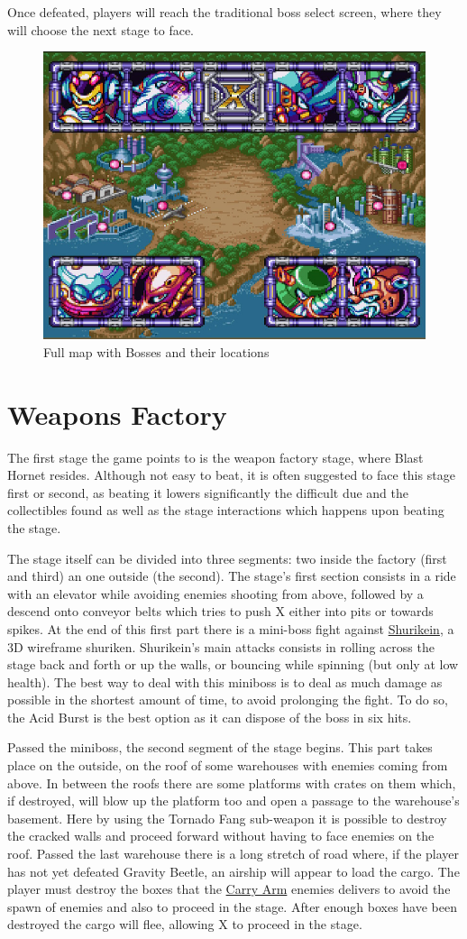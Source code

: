 Once defeated, players will reach the traditional boss select screen, where they will choose the next stage to face.
\begin{figure}[htp]
	\centering
	\includegraphics[width=0.5\linewidth]{figures/X3/Map.png}
	\caption{Full map with Bosses and their locations}
\end{figure}

\section{Weapons Factory}
The first stage the game points to is the weapon factory stage, where Blast Hornet resides. Although not easy to beat, it is often suggested to face this stage first or second, as beating it lowers significantly the difficult due and the collectibles found as well as the  stage interactions which happens upon beating the stage.

The stage itself can be divided into three segments: two inside the factory (first and third) an one outside (the second). The stage's first section consists in a ride with an elevator while avoiding enemies shooting from above, followed by a descend onto conveyor belts which tries to push X either into pits or towards spikes. At the end of this first part there is a mini-boss fight against \hyperlink{miniboss:Shurikein}{Shurikein}, a 3D wireframe shuriken. Shurikein's main attacks consists in rolling across the stage back and forth or up the walls, or bouncing while spinning (but only at low health). The best way to deal with this miniboss is to deal as much damage as possible in the shortest amount of time, to avoid prolonging the fight. To do so, the Acid Burst is the best option as it can dispose of the boss in six hits. 

Passed the miniboss, the second segment of the stage begins. This part takes place on the outside, on the roof of some warehouses with enemies coming from above. In between the roofs there are some platforms with crates on them which, if destroyed, will blow up the platform too and open a passage to the warehouse's basement. Here by using  the Tornado Fang sub-weapon it is possible to destroy the cracked walls and proceed forward without having to face enemies on the roof. Passed the last warehouse there is a long stretch of road where, if the player has not yet defeated Gravity Beetle, an airship will appear to load the cargo. The player must destroy the boxes that the \hyperlink{enem:Carry_Arm}{Carry Arm} enemies delivers to avoid the spawn of enemies and also to proceed in the stage. After enough boxes have been destroyed the cargo will flee, allowing X to proceed in the stage.

